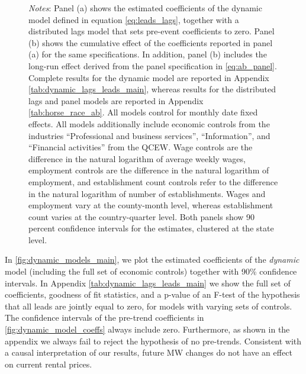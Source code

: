 \begin{figure}[htb!]
\begin{minipage}{0.95\textwidth}
		\vspace{2mm} 
		\textit{Notes}: Panel (a) shows the estimated coefficients of the dynamic model defined in 
		equation \autoref{eq:leads_lags}, together with a distributed lags model that sets pre-event 
		coefficients to zero. Panel (b) shows the cumulative effect of the coefficients reported in 
		panel (a) for the same specifications. In addition, panel (b) includes the long-run effect 
		derived from the panel specification in \autoref{eq:ab_panel}. Complete results for the 
		dynamic model are reported in  Appendix \autoref{tab:dynamic_lags_leads_main}, whereas results for the 
		distributed lags and panel models are reported in Appendix \autoref{tab:horse_race_ab}. 
		All models control for monthly date fixed effects. All models additionally  
		include economic controls from the industries ``Professional and business services'', 
		``Information'', and ``Financial activities'' from the QCEW. Wage controls are 
		the difference in the natural logarithm of average weekly wages, employment 
		controls are the difference in the natural logarithm of employment, and 
		establishment count controls refer to the difference in the natural logarithm 
		of number of establishments. Wages and employment vary at the county-month level,
		whereas establishment count varies at the country-quarter level. Both panels
		show 90 percent confidence intervals for the estimates, clustered at the state level. 
	\end{minipage}
\end{figure}


In \autoref{fig:dynamic_models_main}, we plot the estimated coefficients of the \textit{dynamic} model 
(including the full set of economic controls) together with 90\% confidence intervals. In
Appendix \autoref{tab:dynamic_lags_leads_main} we show the full set of coefficients, goodness of fit 
statistics, and a p-value of an F-test of the hypothesis that all leads are jointly equal to zero, 
for models with varying sets of controls. The confidence intervals of the pre-trend coefficients in 
\autoref{fig:dynamic_model_coeffs} always include zero. Furthermore, as shown in the appendix we 
always fail to reject the hypothesis of no pre-trends. Consistent with a causal interpretation of 
our results, future MW changes do not have an effect on current rental prices. 

